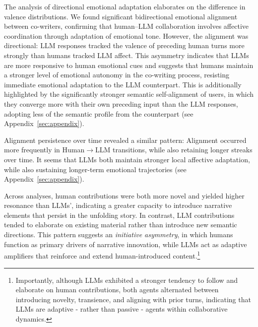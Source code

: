 \documentclass[11pt]{article}
\begin{document}
The analysis of directional emotional adaptation elaborates on the difference in valence distributions. We found significant bidirectional emotional alignment between co-writers, confirming that human--LLM collaboration involves affective coordination through adaptation of emotional tone. However, the alignment was directional: LLM responses tracked the valence of preceding human turns more strongly than humans tracked LLM affect. This asymmetry indicates that LLMs are more responsive to human emotional cues and suggests that humans maintain a stronger level of emotional autonomy in the co-writing process, resisting immediate emotional adaptation to the LLM counterpart. This is additionally highlighted by the significantly stronger semantic self-alignment of users, in which they converge more with their own preceding input than the LLM responses, adopting less of the semantic profile from the counterpart (see Appendix~\ref{sec:appendix}).

Alignment persistence over time revealed a similar pattern: Alignment occurred more frequently in Human$\rightarrow$LLM transitions, while also retaining longer streaks over time. It seems that LLMs both maintain stronger local affective adaptation, while also sustaining longer-term emotional trajectories (see Appendix~\ref{sec:appendix}).

Across analyses, human contributions were both more novel and yielded higher resonance than LLMs', indicating a greater capacity to introduce narrative elements that persist in the unfolding story. In contrast, LLM contributions tended to elaborate on existing material rather than introduce new semantic directions. This pattern suggests an \textit{initiative asymmetry}, in which humans function as primary drivers of narrative innovation, while LLMs act as adaptive amplifiers that reinforce and extend human-introduced content.\footnote{Importantly, although LLMs exhibited a stronger tendency to follow and elaborate on human contributions, both agents alternated between introducing novelty, transience, and aligning with prior turns, indicating that LLMs are adaptive - rather than passive - agents within collaborative dynamics.}
\end{document}
